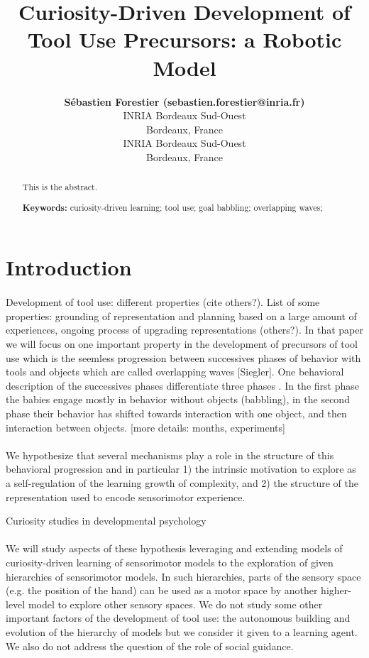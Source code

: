 \documentclass[10pt,letterpaper]{article}
\title{Curiosity-Driven Development of Tool Use Precursors: a Robotic Model}
\author{{\large \bf S\'ebastien Forestier (sebastien.forestier@inria.fr)} \\
	INRIA Bordeaux Sud-Ouest\\
	Bordeaux, France
  \AND {\large \bf Pierre-Yves Oudeyer (pierre-yves.oudeyer@inria.fr)} \\
	INRIA Bordeaux Sud-Ouest\\
	Bordeaux, France}
\begin{document}
\maketitle


\begin{abstract}
This is the abstract.

\textbf{Keywords:} 
curiosity-driven learning; tool use; goal babbling; overlapping waves; 
\end{abstract}


\section{Introduction}

	\paragraph{}
	Development of tool use: different properties \cite{guerin2013survey} (cite others?). 
	List of some properties: grounding of representation and planning based on a large amount of experiences, ongoing process of upgrading representations (others?).
	In that paper we will focus on one important property in the development of precursors of tool use which is the seemless progression 
	between successives phases of behavior with tools and objects which are called overlapping waves [Siegler]. 
	One behavioral description of the successives phases differentiate three phases \cite{guerin2013survey}.
	In the first phase the babies engage mostly in behavior without objects (babbling), in the second phase their behavior has shifted towards interaction with one object, and then interaction between objects.
	[more details: months, experiments]
	
	\paragraph{}
	We hypothesize that several mechanisms play a role in the structure of this behavioral progression and in particular 
	1) the intrinsic motivation to explore as a self-regulation of the learning growth of complexity, and 
	2) the structure of the representation used to encode sensorimotor experience.	
	
	Curiosity studies in developmental psychology 
	\cite{kidd}
	\cite{gottlieb_information-seeking_2013}
	
	\paragraph{}
	We will study aspects of these hypothesis leveraging and extending models of curiosity-driven learning of sensorimotor models to the exploration of given hierarchies of sensorimotor models.
	In such hierarchies, parts of the sensory space (e.g. the position of the hand) can be used as a motor space by another higher-level model to explore other sensory spaces.
	We do not study some other important factors of the development of tool use: the autonomous building and evolution of the hierarchy of models but we consider it given to a learning agent.
	We also do not address the question of the role of social guidance.
	
\end{document}

